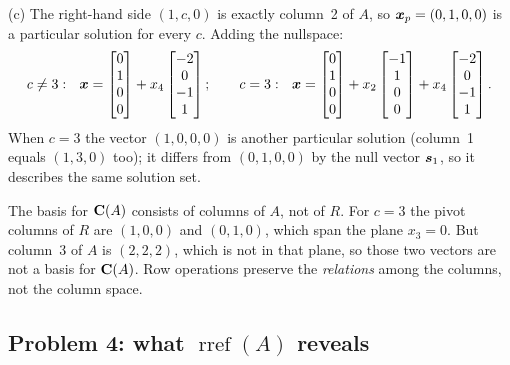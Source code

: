 \begin{solution}
(c) The right-hand side $(1,c,0)$ is exactly column~2 of $A$, so $\boldsymbol{x}_p=(0,1,0,0)$ is a
particular solution for every $c$. Adding the nullspace:
\[
  c\neq 3:\ \ \vb{x}=\begin{bmatrix}0\\1\\0\\0\end{bmatrix}+x_4\begin{bmatrix}-2\\0\\-1\\1\end{bmatrix};
  \qquad
  c=3:\ \ \vb{x}=\begin{bmatrix}0\\1\\0\\0\end{bmatrix}+x_2\begin{bmatrix}-1\\1\\0\\0\end{bmatrix}
   +x_4\begin{bmatrix}-2\\0\\-1\\1\end{bmatrix}.
\]
When $c=3$ the vector $(1,0,0,0)$ is another particular solution (column~1 equals
$(1,3,0)$ too); it differs from $(0,1,0,0)$ by the null vector $\boldsymbol{s}_1$, so it describes
the same solution set.
\end{solution}

\begin{trap}
The basis for $\mathbf{C}(A)$ consists of columns of $A$, not of $R$. For $c=3$ the pivot columns
of $R$ are $(1,0,0)$ and $(0,1,0)$, which span the plane $x_3=0$. But column~3 of $A$ is
$(2,2,2)$, which is not in that plane, so those two vectors are not a basis for $\mathbf{C}(A)$.
Row operations preserve the \emph{relations} among the columns, not the column space.
\end{trap}

\subsection{Problem 4: what \texorpdfstring{$\operatorname{rref}(A)$}{rref(A)} reveals}

